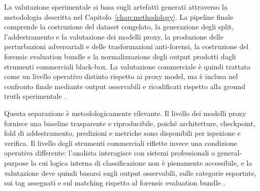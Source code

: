 

La valutazione sperimentale si basa sugli artefatti generati attraverso la
metodologia descritta nel Capitolo~\ref{chap:methodology}. La pipeline finale
comprende la costruzione del dataset congelato, la generazione degli split,
l'addestramento e la valutazione dei modelli proxy, la produzione delle
perturbazioni adversariali e delle trasformazioni anti-forensi, la costruzione
del forensic evaluation bundle e la normalizzazione degli output prodotti dagli
strumenti commerciali black-box. La valutazione commerciale è quindi trattata
come un livello operativo distinto rispetto ai proxy model, ma è inclusa nel
confronto finale mediante output osservabili e ricodificati rispetto alla ground
truth sperimentale \cite{sanna2024preliminary,sanna2025pixelperfect,magnet,cellebrite}.

Questa separazione è metodologicamente rilevante. Il livello dei modelli proxy
fornisce una baseline trasparente e riproducibile, poiché architetture,
checkpoint, fold di addestramento, predizioni e metriche sono disponibili per
ispezione e verifica. Il livello degli strumenti commerciali riflette invece una
condizione operativa differente: l'analista interagisce con sistemi professionali
o general-purpose la cui logica interna di classificazione non è pienamente
accessibile, e la valutazione deve quindi basarsi sugli output osservabili, sulle
categorie esportate, sui tag assegnati e sul matching rispetto al forensic
evaluation bundle \cite{casey2011digital,nist2006guide,iso27041,iso27042}.

